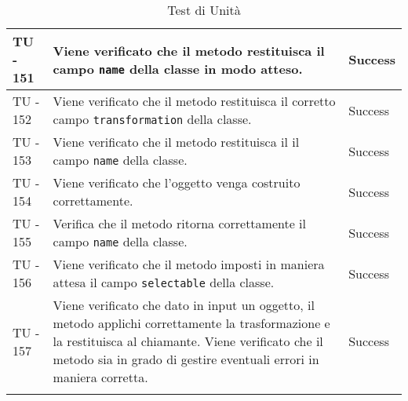 \begin{center}
\begin{longtable}{ | p{3cm} | p{9cm} | p{2cm} | }
TU - 151 & Viene verificato che il metodo restituisca il campo \texttt{name} della classe in modo atteso. & Success \\ \hline
TU - 152 & Viene verificato che il metodo restituisca il corretto campo \texttt{transformation} della classe. & Success \\ \hline
TU - 153 & Viene verificato che il metodo restituisca il  il campo \texttt{name} della classe. & Success \\ \hline
TU - 154 & Viene verificato che l'oggetto venga costruito correttamente. & Success \\ \hline
TU - 155 & Verifica che il metodo ritorna correttamente il campo \texttt{name} della classe. & Success \\ \hline
TU - 156 & Viene verificato che il metodo imposti in maniera attesa il campo \texttt{selectable} della classe.  & Success \\ \hline
TU - 157 & Viene verificato che dato in input un oggetto, il metodo applichi correttamente la trasformazione e la restituisca al chiamante.
Viene verificato che il metodo sia in grado di gestire eventuali errori in maniera corretta. & Success \\ \hline
\caption{Test di Unità}
\end{longtable}
\egroup
\end{center}
